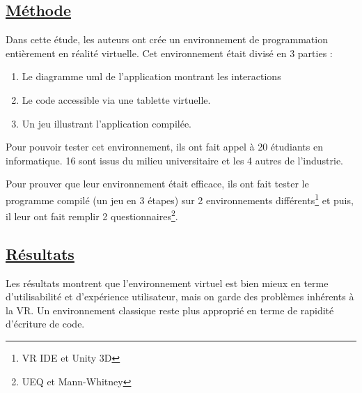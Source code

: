 \documentclass[a4paper,10pt, oneside]{article}
\newcommand{\li}{\newline}
\begin{document}
\subsection{\ul{Méthode}}
    \par Dans cette étude, les auteurs ont crée un environnement de programmation entièrement en réalité virtuelle. Cet environnement était divisé en 3 parties : 
    \begin{enumerate}
        \item Le diagramme uml de l'application montrant les interactions
        \item Le code accessible via une tablette virtuelle.
        \item Un jeu illustrant l'application compilée.
    \end{enumerate}
    \par Pour pouvoir tester cet environnement, ils ont fait appel à 20 étudiants en informatique. 16 sont issus du milieu universitaire et les 4 autres de l'industrie.\li 
    \par Pour prouver que leur environnement était efficace, ils ont fait tester le programme compilé (un jeu en 3 étapes) sur 2 environnements différents\footnote{VR IDE et Unity 3D} et puis, il leur ont fait remplir 2 questionnaires\footnote{UEQ et Mann-Whitney}.
\subsection{\ul{Résultats}}
    \par Les résultats montrent que l'environnement virtuel est bien mieux en terme d'utilisabilité et d'expérience utilisateur, mais on garde des problèmes inhérents à la VR. Un environnement classique reste plus approprié en terme de rapidité d'écriture de code.
\newpage 


\end{document}
